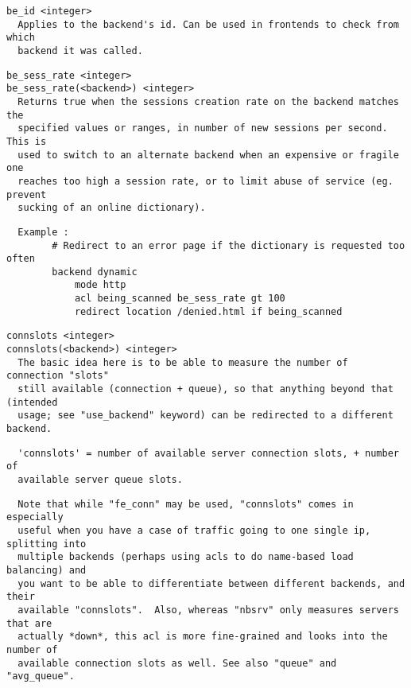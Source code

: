 \begin{verbatim}
be_id <integer>
  Applies to the backend's id. Can be used in frontends to check from which
  backend it was called.
\end{verbatim}

\begin{verbatim}
be_sess_rate <integer>
be_sess_rate(<backend>) <integer>
  Returns true when the sessions creation rate on the backend matches the
  specified values or ranges, in number of new sessions per second. This is
  used to switch to an alternate backend when an expensive or fragile one
  reaches too high a session rate, or to limit abuse of service (eg. prevent
  sucking of an online dictionary).
\end{verbatim}

\begin{verbatim}
  Example :
        # Redirect to an error page if the dictionary is requested too often
        backend dynamic
            mode http
            acl being_scanned be_sess_rate gt 100
            redirect location /denied.html if being_scanned
\end{verbatim}

\begin{verbatim}
connslots <integer>
connslots(<backend>) <integer>
  The basic idea here is to be able to measure the number of connection "slots"
  still available (connection + queue), so that anything beyond that (intended
  usage; see "use_backend" keyword) can be redirected to a different backend.
\end{verbatim}

\begin{verbatim}
  'connslots' = number of available server connection slots, + number of
  available server queue slots.
\end{verbatim}

\begin{verbatim}
  Note that while "fe_conn" may be used, "connslots" comes in especially
  useful when you have a case of traffic going to one single ip, splitting into
  multiple backends (perhaps using acls to do name-based load balancing) and
  you want to be able to differentiate between different backends, and their
  available "connslots".  Also, whereas "nbsrv" only measures servers that are
  actually *down*, this acl is more fine-grained and looks into the number of
  available connection slots as well. See also "queue" and "avg_queue".
\end{verbatim}

